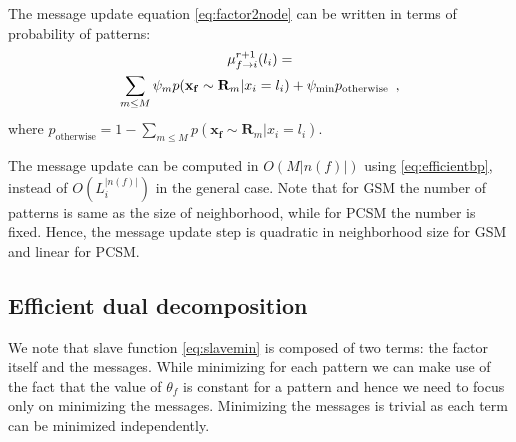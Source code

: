 \documentclass[letterpaper, 10 pt, conference]{ieeeconf} %
\newcommand{\vect}[1]{\mathbf{#1}}
\begin{document}
The message update equation \eqref{eq:factor2node} can be written in terms of
probability of patterns:
\begin{multline}
  \bpmsg{f}{i}{l_i}{r+1} =\\
  \sum_{m \le M} \psi_m p(\vect{x_f} \sim \vect{R}_m|x_i = l_i)
  + \psi_{\text{min}} p_{\text{otherwise}}
  \label{eq:efficientbp}
  \enspace,
\end{multline}
where $p_{\text{otherwise}} = 1 - \sum_{m \le M}p(\vect{x_f} \sim \vect{R}_m|x_i = l_i)$.

The message update can be computed in $O(M|n(f)|)$ using
\eqref{eq:efficientbp}, instead of $O(L_i^{|n(f)|})$ in the general case. Note
that for GSM the number of patterns is same as the size of neighborhood, while
for PCSM the number is fixed.  Hence, the message update step is quadratic in
neighborhood size for GSM and linear for PCSM. 

\subsection{Efficient dual decomposition}
We note that slave function \eqref{eq:slavemin} is composed of two
terms: the factor itself and the messages. 
While minimizing for each pattern we can make use of the fact that the value
of $\theta_f$ is constant for a pattern and hence we need to focus only on
minimizing the messages. Minimizing the messages is trivial as each term can be
minimized independently.
\end{document}
